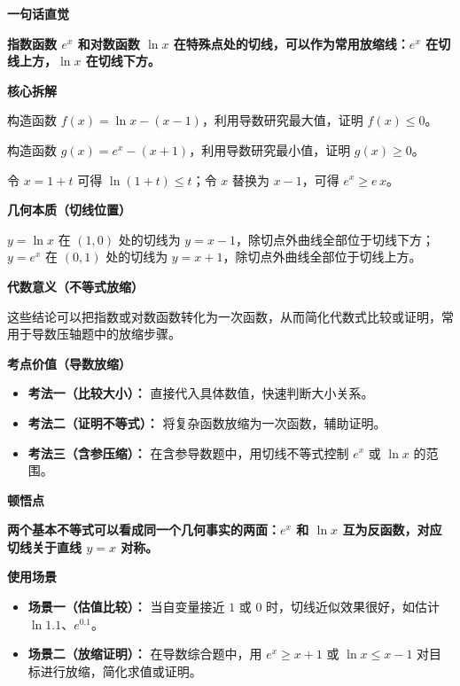 \begin{explanationbox}
	\textbf{\textcolor{CExplanation}{一句话直觉}}

	\textbf{指数函数 $e^x$ 和对数函数 $\ln x$ 在特殊点处的切线，可以作为常用放缩线：$e^x$ 在切线上方，$\ln x$ 在切线下方。}

	\medskip
	\textbf{\textcolor{CExplanation}{核心拆解}}
	\begin{description}[style=nextline, leftmargin=2.8em, labelsep=0.5em, itemsep=0.45em]
		\item[\textbf{要点一（对数构造）：}]
		      构造函数 $f(x)=\ln x-(x-1)$，利用导数研究最大值，证明 $f(x)\le0$。
		\item[\textbf{要点二（指数构造）：}]
		      构造函数 $g(x)=e^x-(x+1)$，利用导数研究最小值，证明 $g(x)\ge0$。
		\item[\textbf{要点三（变形来源）：}]
		      令 $x=1+t$ 可得 $\ln(1+t)\le t$；令 $x$ 替换为 $x-1$，可得 $e^x\ge e\,x$。
	\end{description}

	\medskip
	\textbf{\textcolor{CExplanation}{几何本质（切线位置）}}

	$y=\ln x$ 在 $(1,0)$ 处的切线为 $y=x-1$，除切点外曲线全部位于切线下方；$y=e^x$ 在 $(0,1)$ 处的切线为 $y=x+1$，除切点外曲线全部位于切线上方。

	\medskip
	\textbf{\textcolor{CExplanation}{代数意义（不等式放缩）}}

	这些结论可以把指数或对数函数转化为一次函数，从而简化代数式比较或证明，常用于导数压轴题中的放缩步骤。

	\medskip
	\textbf{\textcolor{CExplanation}{考点价值（导数放缩）}}
	\begin{itemize}[leftmargin=*, itemsep=0.5em, topsep=0.4em]
		\item \textbf{考法一（比较大小）：} 直接代入具体数值，快速判断大小关系。
		\item \textbf{考法二（证明不等式）：} 将复杂函数放缩为一次函数，辅助证明。
		\item \textbf{考法三（含参压缩）：} 在含参导数题中，用切线不等式控制 $e^x$ 或 $\ln x$ 的范围。
	\end{itemize}

	\medskip
	\textbf{\textcolor{CExplanation}{顿悟点}}

	\textbf{两个基本不等式可以看成同一个几何事实的两面：$e^x$ 和 $\ln x$ 互为反函数，对应切线关于直线 $y=x$ 对称。}

	\medskip
	\textbf{\textcolor{CExplanation}{使用场景}}
	\begin{itemize}[leftmargin=*, itemsep=0.5em, topsep=0.4em]
		\item \textbf{场景一（估值比较）：} 当自变量接近 $1$ 或 $0$ 时，切线近似效果很好，如估计 $\ln 1.1$、$e^{0.1}$。
		\item \textbf{场景二（放缩证明）：} 在导数综合题中，用 $e^x\ge x+1$ 或 $\ln x\le x-1$ 对目标进行放缩，简化求值或证明。
	\end{itemize}
\end{explanationbox}